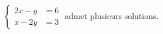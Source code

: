 $\begin{cases}2x-y &= 6 \\ x-2y &= 3\end{cases}$ admet plusieurs solutions.

\begin{reponses}
\end{reponses}

